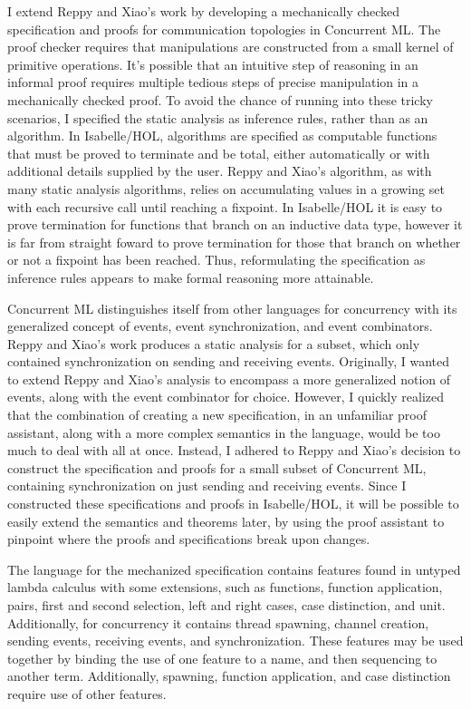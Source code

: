 \documentclass[letterpaper, 11pt]{report}
\begin{document}
I extend Reppy and Xiao's work by developing a mechanically checked specification and proofs
for communication topologies in Concurrent ML. The proof checker requires that manipulations are
constructed from a small kernel of primitive operations. It's possible that an intuitive step of reasoning in an
informal proof requires multiple tedious steps of precise manipulation in a mechanically checked proof.
To avoid the chance of running into these tricky scenarios, I specified the static analysis
as inference rules, rather than as an algorithm. In Isabelle/HOL, algorithms are specified as computable functions
that must be proved to terminate and be total, either automatically or with additional details supplied by the user.
Reppy and Xiao's algorithm, as with many static analysis algorithms, relies on accumulating values in a growing set
with each recursive call until reaching a fixpoint.
In Isabelle/HOL it is easy to prove termination for functions that branch on an inductive data type, 
however it is far from straight foward to prove termination for those that branch on
whether or not a fixpoint has been reached. Thus, reformulating the specification as inference rules
appears to make formal reasoning more attainable. 

Concurrent ML distinguishes itself from other languages for concurrency with its generalized concept of events,
event synchronization, and event combinators. Reppy and Xiao's work produces a static analysis for a subset,
which only contained synchronization on sending and receiving events. Originally, I wanted to extend Reppy and Xiao's
analysis to encompass a more generalized notion of events, along with the event combinator for choice.
However, I quickly
realized that the combination of creating a new specification, in an unfamiliar proof assistant, along with a more complex
semantics in the language, would be too much to deal with all at once. Instead, I adhered to Reppy and Xiao's decision
to construct the specification and proofs for a small subset of Concurrent ML, containing synchronization on just
sending and receiving events. Since I constructed these specifications and proofs in Isabelle/HOL, it will be possible
to easily extend the semantics and theorems later, by using the proof assistant to pinpoint where the proofs and
specifications break upon changes.

The language for the mechanized specification contains features found in untyped lambda calculus with
some extensions, such as functions, function application, pairs, first and second selection, left and right cases, case distinction, 
and unit. 
Additionally, for concurrency it contains thread spawning, channel creation, sending events, receiving events, and synchronization.
These features may be used together by binding the use of one feature to a name, and then
sequencing to another term. Additionally, spawning, function application, and case distinction require use of other features.
\end{document}
